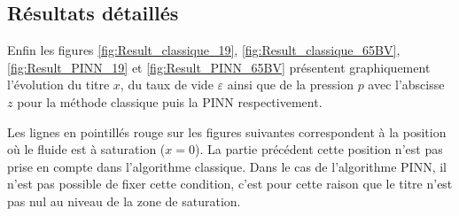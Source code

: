 \subsection{Résultats détaillés}

Enfin les figures \ref{fig:Result_classique_19}, \ref{fig:Result_classique_65BV}, \ref{fig:Result_PINN_19} et \ref{fig:Result_PINN_65BV} présentent graphiquement l'évolution du titre $x$, du taux de vide $\varepsilon$ ainsi que de la pression $p$ avec l'abscisse $z$ pour la méthode classique puis la PINN respectivement.


Les lignes en pointillés rouge sur les figures suivantes correspondent à la position où le fluide est à saturation ($x=0$). La partie précédent cette position n'est pas prise en compte dans l'algorithme classique. Dans le cas de l'algorithme PINN, il n'est pas possible de fixer cette condition, c'est pour cette raison que le titre n'est pas nul au niveau de la zone de saturation.


